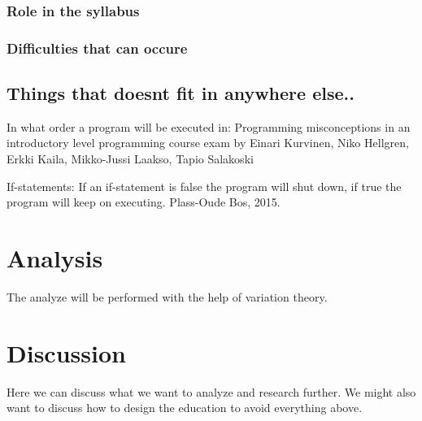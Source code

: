 \documentclass[twocolumn]{article}
\begin{document}
\subsubsection{Role in the syllabus}

\subsubsection{Difficulties that can occure}

\subsection{Things that doesnt fit in anywhere else..}

In what order a program will be executed in: Programming misconceptions in an introductory level programming course exam by Einari Kurvinen, Niko Hellgren, Erkki Kaila, Mikko-Jussi Laakso, Tapio Salakoski

If-statements: If an if-statement is false the program will shut down, if true the program will keep on executing. Plass-Oude Bos, 2015.


\section{Analysis}

The analyze will be performed with the help of variation theory. 

\section{Discussion}

Here we can discuss what we want to analyze and research further. We might also want to discuss how to design the education to avoid everything above.

\newpage
\end{document}
